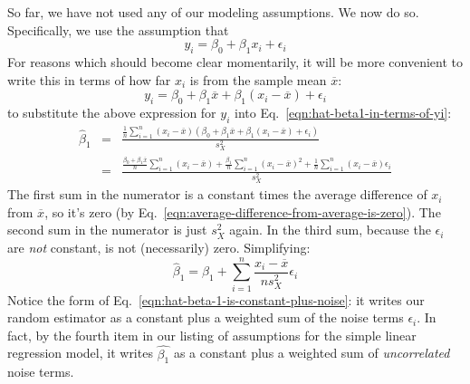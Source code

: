 \documentclass{article}
\begin{document}
So far, we have not used any of our modeling assumptions.  We now
do so.  Specifically, we use the assumption that
\begin{equation}
y_i = \beta_0 + \beta_1 x_i + \epsilon_i
\end{equation}
For reasons which should become clear momentarily, it will be more convenient
to write this in terms of how far $x_i$ is from the sample mean $\overline{x}$:
\begin{equation}
y_i = \beta_0 + \beta_1 \overline{x} + \beta_1 (x_i - \overline{x}) + \epsilon_i
\end{equation}
to substitute the above expression for $y_i$ into Eq.\ \ref{eqn:hat-beta1-in-terms-of-yi}:
\begin{eqnarray}
\hat{\beta}_1 & = & \frac{\frac{1}{n}\sum_{i=1}^{n}{(x_i - \overline{x})(\beta_0 + \beta_1\overline{x} + \beta_1 (x_i-\overline{x}) + \epsilon_i)}}{s^2_X}\\
& = & \frac{\frac{\beta_0+\beta_1 \overline{x}}{n}\sum_{i=1}^{n}{(x_i-\overline{x})} + \frac{\beta_1}{n}\sum_{i=1}^{n}{(x_i-\overline{x})^2} + \frac{1}{n}\sum_{i=1}^{n}{(x_i - \overline{x})\epsilon_i}}{s^2_X}
\end{eqnarray}
The first sum in the numerator is a constant times the average difference of
$x_i$ from $\overline{x}$, so it's zero (by Eq.\
\ref{eqn:average-difference-from-average-is-zero}).  The second sum in the
numerator is just $s^2_X$ again.  In the third sum, because the $\epsilon_i$
are {\em not} constant, is not (necessarily) zero.  Simplifying:
\begin{equation}
\label{eqn:hat-beta-1-is-constant-plus-noise}
\hat{\beta}_1 = \beta_1 + \sum_{i=1}^{n}{\frac{x_i - \overline{x}}{ns^2_X}\epsilon_i}
\end{equation}
Notice the form of Eq.\ \ref{eqn:hat-beta-1-is-constant-plus-noise}: it writes
our random estimator as a constant plus a weighted sum of the noise terms
$\epsilon_i$.  In fact, by the fourth item in our listing of assumptions for
the simple linear regression model, it writes $\hat{\beta_1}$ as a constant
plus a weighted sum of {\em uncorrelated} noise terms.
\end{document}
